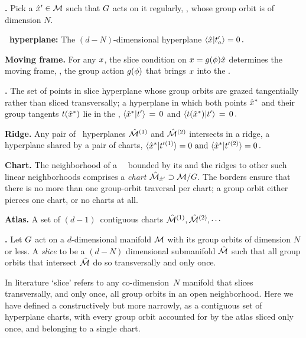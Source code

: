 \documentclass[aip,cha,reprint,
secnumarabic,
nofootinbib, tightenlines,
nobibnotes, showkeys, showpacs,
groupedaddress
]{revtex4-1}
\begin{document}
\noindent\textbf{\Template.}
Pick a {\template} ${\hat{x}'} \in {\cal M}$ such that $G$ acts on it
regularly, \ie, whose group orbit is of dimension $N$.

\noindent\textbf{\Slice\ hyperplane:}
The $(d\!-\!N)$-dimensional hyperplane
\( %
\braket{\sspRed}{\sliceTan{a}}=0
\,.
\) %

\noindent\textbf{Moving frame.}
For any $x$, the slice condition   on $x =
g({\bf \phi})\hat{x}$ determines the moving frame, \ie, the group
action $g({\bf \phi})$ that brings $ x$ into the \slice.

\noindent\textbf{\ChartBord.}
The set of points in slice hyperplane whose group orbits are grazed
tangentially rather than sliced transversally; a hyperplane in which both
points $\hat{x}^\ast$ and their group tangents $t(\hat{x}^\ast)$ lie in
the {\slice}, $\braket{\sspRSing}{\sliceTan{}} \,=\, 0$ and
$\braket{\groupTan(\sspRSing)}{\sliceTan{}} \,=\, 0 \,.$

\noindent\textbf{Ridge.}
Any pair of \slice\ hyperplanes $\hat{\cal M}{}^{(1)}$ and $\hat{\cal M}{}^{(2)}$
intersects in a {ridge}, a hyperplane {\PoincS} shared by a pair of
charts,
\(
\braket{\sspRed^*}{\sliceTan{}{}^{(1)}} = 0
\mbox{ and }
\braket{\sspRed^*}{\sliceTan{}{}^{(2)}} = 0
    \,.
\) %

\noindent\textbf{Chart.}
The neighborhood of a \template\ \slicep\ bounded by its {\chartBord} and
the ridges to other such linear neighborhoods comprises a \emph{chart}
$\hat{\cal M}_{{\hat{x}'}} \supset {\cal M}/G$. The borders ensure that there is
no more than one group-orbit traversal per chart; a group orbit either
pierces one chart, or no charts at all.

\noindent\textbf{Atlas.}
A set of $(d\!-\!1)$\dmn\ contiguous charts $\hat{\cal M}{}^{(1)},
\hat{\cal M}{}^{(2)}, \cdots$

\noindent\textbf{\Slice.}
Let $G$ act on a $d$-dimensional manifold ${\cal M}$ with its group
orbits of dimension $N$ or less. A \emph{slice} to be a $(d\!-\!N)$
dimensional submanifold $\hat{\cal M}$ such that all group orbits that
intersect $\hat{\cal M}$ do so transversally and only once.

In literature `slice' refers to any
co-dimension~$N$ manifold that slices transversally, and only once, all
group orbits in an open neighborhood. Here we have defined a {\slice}
constructively but more narrowly, as a contiguous set of hyperplane
charts, with every group orbit accounted for by the atlas sliced only
once, and belonging to a single chart.
\end{document}
